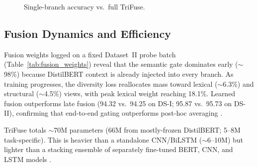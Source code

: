 \documentclass[10pt,twocolumn,a4paper]{article}
\begin{document}
\begin{table}[!t]
\caption{Single-branch performance (\%).}
\label{tab:single_branch_dual}
\centering
{}
\end{table}

\begin{figure}[!t]
\centering

\caption{Single-branch accuracy vs.\ full TriFuse.}
\label{fig:feature_effect}
\end{figure}

\subsection{Fusion Dynamics and Efficiency}\label{subsec:fusion_weights}

Fusion weights logged on a fixed Dataset~II probe batch (Table~\ref{tab:fusion_weights}) reveal that the semantic gate dominates early ($\sim$98\%) because DistilBERT context is already injected into every branch. As training progresses, the diversity loss reallocates mass toward lexical ($\sim$6.3\%) and structural ($\sim$4.5\%) views, with peak lexical weight reaching 18.1\%. Learned fusion outperforms late fusion (94.32 vs.\ 94.25 on DS-I; 95.87 vs.\ 95.73 on DS-II), confirming that end-to-end gating outperforms post-hoc averaging \citep{ref19}.

TriFuse totals $\sim$70M parameters (66M from mostly-frozen DistilBERT; 5--8M task-specific). This is heavier than a standalone CNN/BiLSTM ($\sim$6--10M) but lighter than a stacking ensemble of separately fine-tuned BERT, CNN, and LSTM models \citep{ref14}.
\end{document}
